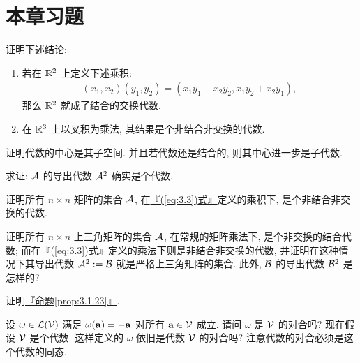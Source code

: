 \documentclass[lang=cn,zihao=-4,twoside,fontset=none]{textbook}
\def\eq#1{\[\begin{aligned}{}#1\end{aligned}\]}
\renewcommand{\eqref}[1]{\hyperref[#1]{『\textnormal{(\ref*{#1})}式』}}
\newcommand{\propref}[1]{\hyperref[#1]{『命题\textnormal{\ref*{#1}}』}}
\newcommand{\nalph}{\textnormal{(\alph*)}}
\begin{document}
\newpage
\section{本章习题}\label{sec:3.7}

\begin{problem}
    \label{ex:3.1}%
    证明下述结论:
    \begin{enumerate}[label=\nalph]
        \item 若在 ${\mathbb R}^2$ 上定义下述乘积: 
        \eq{
            (x_1,x_2)(y_1,y_2)=(x_1y_1-x_2y_2,x_1y_2+x_2y_1),
        }
        那么 ${\mathbb R}^2$ 就成了结合的交换代数. 
        \item 在 ${\mathbb R}^3$ 上以叉积为乘法, 其结果是个非结合非交换的代数.
    \end{enumerate}
\end{problem}

\begin{problem}
    \label{ex:3.2}%
    证明代数的中心是其子空间. 并且若代数还是结合的, 则其中心进一步是子代数.
\end{problem}

\begin{problem}
    \label{ex:3.3}%
    求证: ${\mathcal A}$ 的导出代数 ${\mathcal A}^2$ 确实是个代数.
\end{problem}


\begin{problem}
    \label{ex:3.4}%
    证明所有 $n\times n$ 矩阵的集合 ${\mathcal A}$, 在\eqref{eq:3.3}定义的乘积下, 是个非结合非交换的代数.
\end{problem}

\begin{problem}
    \label{ex:3.5}%
    证明所有 $n\times n$ 上三角矩阵的集合 ${\mathcal A}$, 在常规的矩阵乘法下, 是个非交换的结合代数; 而在\eqref{eq:3.3}定义的乘法下则是非结合非交换的代数, 并证明在这种情况下其导出代数 ${\mathcal A}^2:={\mathcal B}$ 就是严格上三角矩阵的集合. 此外, ${\mathcal B}$ 的导出代数 ${\mathcal B}^2$ 是怎样的?
\end{problem}

\begin{problem}
    \label{ex:3.6}%
    证明\propref{prop:3.1.23}.
\end{problem}

\begin{problem}
    \label{ex:3.7}%
    设 $\omega\in{\mathcal L}({\mathcal V})$ 满足 $\omega({\mathbf a})=-{\mathbf a}$ 对所有 ${\mathbf a}\in{\mathcal V}$ 成立. 请问 $\omega$ 是 ${\mathcal V}$ 的对合吗? 现在假设 ${\mathcal V}$ 是个代数. 这样定义的 $\omega$ 依旧是代数 ${\mathcal V}$ 的对合吗? 注意代数的对合必须是这个代数的同态.
\end{problem}
\end{document}
